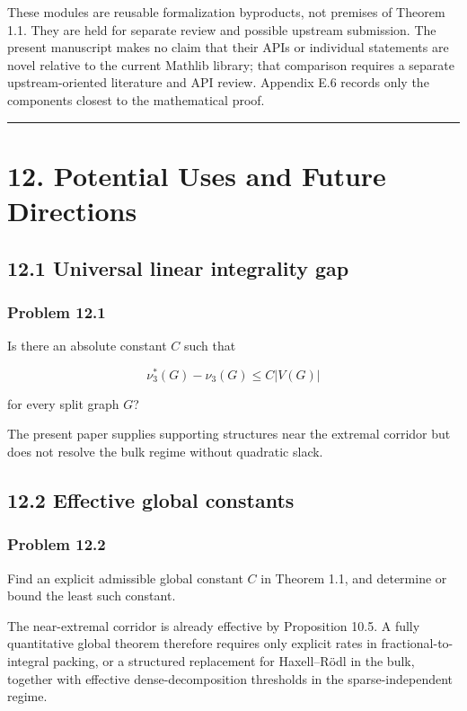 \documentclass[
  american,
  11pt,
  a4paper,
]{article}
\begin{document}
These modules are reusable formalization byproducts, not premises of Theorem 1.1. They are held for separate review and possible upstream submission. The present manuscript makes no claim that their APIs or individual statements are novel relative to the current Mathlib library; that comparison requires a separate upstream-oriented literature and API review. Appendix E.6 records only the components closest to the mathematical proof.

\begin{center}\rule{0.5\linewidth}{0.5pt}\end{center}

\section{12. Potential Uses and Future Directions}\label{potential-uses-and-future-directions}

\subsection{12.1 Universal linear integrality gap}\label{universal-linear-integrality-gap}

\subsubsection{Problem 12.1}\label{problem-12.1}

Is there an absolute constant \(C\) such that

\[
\nu_3^*(G)-\nu_3(G)
\le C|V(G)|
\]

for every split graph \(G\)?

The present paper supplies supporting structures near the extremal corridor but does not resolve the bulk regime without quadratic slack.

\subsection{12.2 Effective global constants}\label{effective-global-constants}

\subsubsection{Problem 12.2}\label{problem-12.2}

Find an explicit admissible global constant \(C\) in Theorem 1.1, and determine or bound the least such constant.

The near-extremal corridor is already effective by Proposition 10.5. A fully quantitative global theorem therefore requires only explicit rates in fractional-to-integral packing, or a structured replacement for Haxell--Rödl in the bulk, together with effective dense-decomposition thresholds in the sparse-independent regime.
\end{document}
